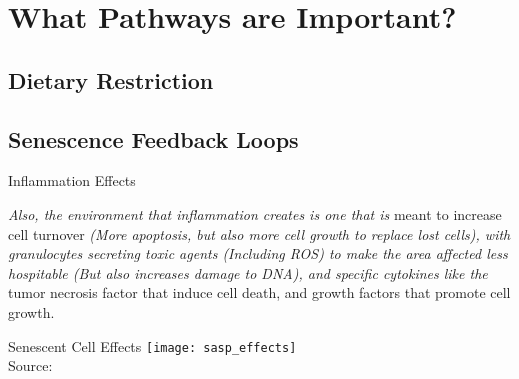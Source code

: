 \section{What Pathways are Important?}




\subsection{Dietary Restriction}

\subsection{Senescence Feedback Loops}


\begin{frame}[c]{Inflammation Effects}
    \begin{aquote}{\cite{NintilTh68:online}}
        {\em Also, the environment that inflammation creates is one that is} meant to
        increase cell turnover {\em (More apoptosis, but also more cell growth to
        replace lost cells), with granulocytes secreting toxic agents
        (Including ROS) to make the area affected less hospitable (But also
        increases damage to DNA), and specific cytokines like the} tumor
        necrosis factor that induce cell death, and growth factors that promote
        cell growth.
    \end{aquote}
\end{frame}

\begin{frame}[c]{Senescent Cell Effects}
    \texttt{[image: sasp\_effects]} \\
    Source: \cite{malaquin2016keeping}
\end{frame}

